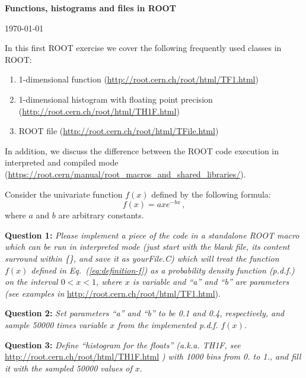 \documentclass[11pt]{article}
\begin{document}
\begin{center}
\Large{\bf{Functions, histograms and files in ROOT}}\\
\end{center}
\begin{center}
{\small\today}
\end{center}

\bigskip

\noindent In this first ROOT exercise we cover the following frequently used classes in ROOT:
%
\begin{enumerate}
\item 1-dimensional function (\url{http://root.cern.ch/root/html/TF1.html})
\item 1-dimensional histogram with floating point precision (\url{http://root.cern.ch/root/html/TH1F.html})
\item ROOT file (\url{http://root.cern.ch/root/html/TFile.html}) 
\end{enumerate} 
In addition, we discuss the difference between the ROOT code execution in interpreted and compiled mode (\url{https://root.cern/manual/root_macros_and_shared_libraries/}).
%

\bigskip\bigskip\bigskip

\noindent Consider the univariate function $f(x)$ defined by the following formula:
% 
\begin{equation}
f(x) = axe^{-bx}\,,
\label{eq:definition-f}
\end{equation}
%
where $a$ and $b$ are arbitrary constants.

\bigskip

\noindent\textbf{Question 1:} {\it Please implement a piece of the code in a standalone ROOT macro which can be run in interpreted mode (just start with the blank file, its content surround within \{\}, and save it as yourFile.C) which will treat the function $f(x)$ defined in Eq.~(\ref{eq:definition-f}) as a probability density function (p.d.f.) on the interval $0 < x < 1$, where $x$ is variable and ``a'' and ``b'' are parameters (see examples in} \url{http://root.cern.ch/root/html/TF1.html}).

\bigskip

\noindent\textbf{Question 2:} {\it Set parameters ``a'' and ``b'' to be 0.1 and 0.4, respectively, and sample 50000 times variable $x$ from the implemented p.d.f. $f(x)$.}

\bigskip

\noindent\textbf{Question 3:} {\it Define ``histogram for the floats'' (a.k.a. TH1F, see} \url{http://root.cern.ch/root/html/TH1F.html} {\it ) with 1000 bins from 0. to 1., and fill it with the sampled 50000 values of $x$}.
\end{document}
